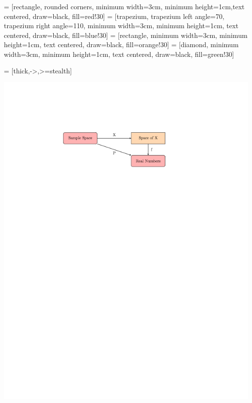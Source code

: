 \documentclass[10pt,]{book}
\theoremstyle{plain}
\theoremstyle{definition}
\theoremstyle{definition}
\numberwithin{equation}{section}
\begin{document}
{
\usetikzlibrary{shapes.geometric, arrows}
 = [rectangle, rounded corners, minimum width=3cm, minimum height=1cm,text centered, draw=black, fill=red!30]
 = [trapezium, trapezium left angle=70, trapezium right angle=110, minimum width=3cm, minimum height=1cm, text centered, draw=black, fill=blue!30]
 = [rectangle, minimum width=3cm, minimum height=1cm, text centered, draw=black, fill=orange!30]
 = [diamond, minimum width=3cm, minimum height=1cm, text centered, draw=black, fill=green!30]

 = [thick,->,>=stealth]


}
\includegraphics[width=1\linewidth]{images/randomvariable.png}
\typeout{************************************************}
\typeout{************************************************}
\end{document}
